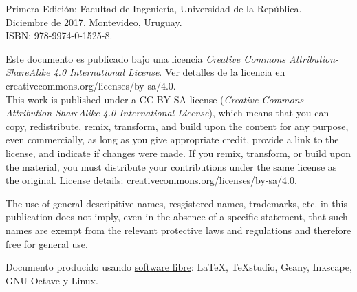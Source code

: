 \documentclass[spanish,twoside,openright,10pt]{book}
\begin{document}
\noindent
Primera Edición: Facultad de Ingeniería, Universidad de la República.\\
Diciembre de 2017, Montevideo, Uruguay.\\
ISBN: 978-9974-0-1525-8.\\

\vfill
\begin{small}

\noindent
Este documento es publicado bajo una licencia \textit{Creative Commons Attribution-ShareAlike 4.0 International License}. Ver detalles de la licencia en creativecommons.org/licenses/by-sa/4.0.\\

\noindent
This work is published under a CC BY-SA license (\textit{Creative Commons Attribution-ShareAlike 4.0 International License}), which means that you can copy, redistribute, remix, transform, and build upon the content for any purpose, even commercially, as long as you give appropriate credit, provide a link to the license, and indicate if changes were made. If you remix, transform, or build upon the material, you must distribute your contributions under the same license as the original. License details: \href{https://creativecommons.org/licenses/by-sa/4.0/}{creativecommons.org/licenses/by-sa/4.0}.

\vspace{2mm}

\noindent
The use of general descripitive names, resgistered names, trademarks, etc. in this publication does not imply, even in the absence of a specific statement, that such names are exempt from the relevant protective laws and regulations and therefore free for general use.

\end{small}

\vspace{3mm}

\noindent
\begin{footnotesize}
Documento producido usando \href{https://es.wikipedia.org/wiki/Software_libre}{software libre}: \LaTeX, TeXstudio, Geany, Inkscape, GNU-Octave y Linux.
\end{footnotesize}

\tableofcontents
\thispagestyle{empty}

\mainmatter



%
 
%




%
%

%
%

\end{document}
